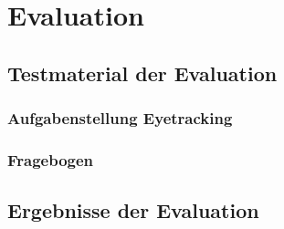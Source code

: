 \documentclass[Bachelorarbeit.tex]{subfiles}
\begin{document}
\chapter{Evaluation}
\label{anhangEvaluation}

\section{Testmaterial der Evaluation}
\label{anhangTestmaterial}

\newpage
\subsection{Aufgabenstellung Eyetracking}
\label{anhangEyetracking}

\newpage
\subsection{Fragebogen}
\label{anhangFragebogen}



\section{Ergebnisse der Evaluation}
\label{anhangErgebnisse}
\end{document}

